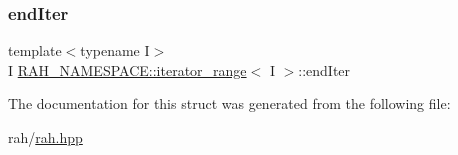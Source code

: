 \subsubsection{\texorpdfstring{endIter}{endIter}}
{\footnotesize\ttfamily template$<$typename I$>$ \\
I \mbox{\hyperlink{struct_r_a_h___n_a_m_e_s_p_a_c_e_1_1iterator__range}{R\+A\+H\+\_\+\+N\+A\+M\+E\+S\+P\+A\+C\+E\+::iterator\+\_\+range}}$<$ I $>$\+::end\+Iter}



The documentation for this struct was generated from the following file\+:\begin{DoxyCompactItemize}
\item 
rah/\mbox{\hyperlink{rah_8hpp}{rah.\+hpp}}\end{DoxyCompactItemize}
